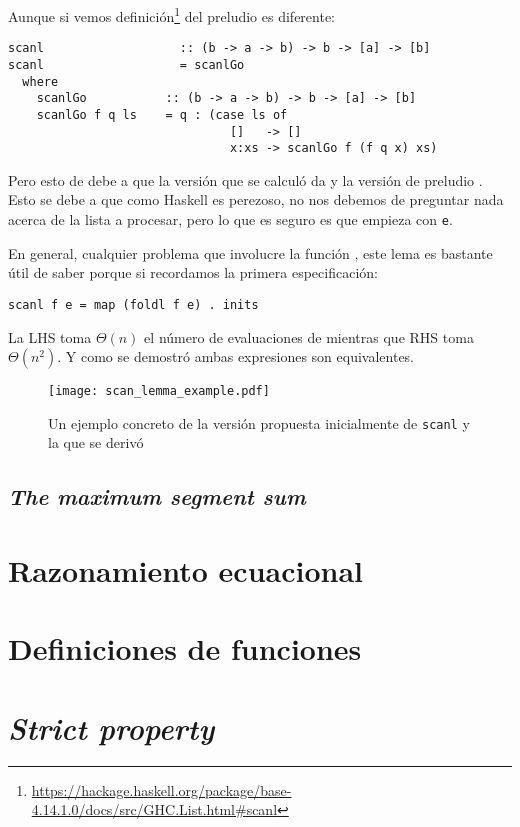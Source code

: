 Aunque si vemos definición\footnote{
\url{https://hackage.haskell.org/package/base-4.14.1.0/docs/src/GHC.List.html\#scanl}
} del preludio es diferente:
\begin{verbatim}
scanl                   :: (b -> a -> b) -> b -> [a] -> [b]
scanl                   = scanlGo
  where
    scanlGo           :: (b -> a -> b) -> b -> [a] -> [b]
    scanlGo f q ls    = q : (case ls of
                               []   -> []
                               x:xs -> scanlGo f (f q x) xs)
\end{verbatim}

Pero esto de debe a que la versión que se calculó da  y la
versión de preludio . Esto se debe a que como Haskell
es perezoso, no nos debemos de preguntar nada acerca de la lista a procesar, pero lo que es seguro
es que empieza con \texttt{e}.

En general, cualquier problema que involucre la función , este lema es bastante útil
de saber porque si recordamos la primera especificación:
\begin{verbatim}
scanl f e = map (foldl f e) . inits
\end{verbatim}

La LHS toma $\Theta(n)$ el número de evaluaciones de  mientras que RHS toma $\Theta(n^2)$.
Y como se demostró ambas expresiones son equivalentes.

\begin{figure}[h]
\caption{Un ejemplo concreto de la versión propuesta inicialmente de \texttt{scanl} y la que se derivó}
\centering
\texttt{[image: scan\_lemma\_example.pdf]}
\end{figure}

\subsection{\textit{The maximum segment sum}}

\section{Razonamiento ecuacional}

\section{Definiciones de funciones}

\section{\textit{Strict property}}



